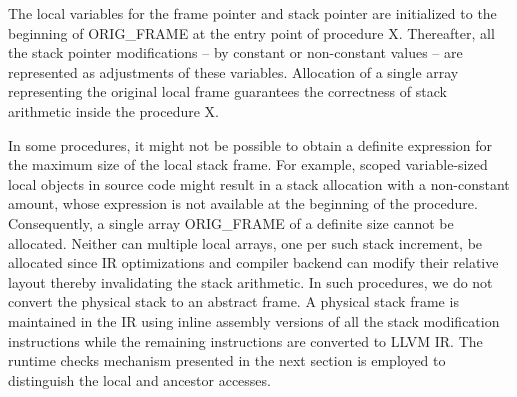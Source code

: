 The local variables for the frame pointer and stack pointer are initialized to the beginning of ORIG\_FRAME at the entry point of procedure X. Thereafter, all the stack pointer modifications -- by constant or non-constant values -- are represented as adjustments of these variables. Allocation of a single array representing the original local frame guarantees the correctness of stack arithmetic inside the procedure X.

In some procedures, it might not be possible to obtain a definite expression for the maximum size of the local stack frame. For example, scoped variable-sized local objects in source code might result in a stack allocation with a non-constant amount, whose expression is not available at the beginning of the procedure. Consequently, a single array ORIG\_FRAME of a definite size cannot be allocated. Neither can multiple local arrays, one per such stack increment, be allocated since IR optimizations and compiler backend can modify their relative layout thereby invalidating the stack arithmetic. In such procedures, we do not convert the physical stack 	to an abstract frame. A physical stack frame is maintained in the IR using inline assembly versions of all the stack modification instructions while the remaining instructions are converted to LLVM IR. The runtime checks mechanism presented in the next section is employed to distinguish the local and ancestor accesses. 

